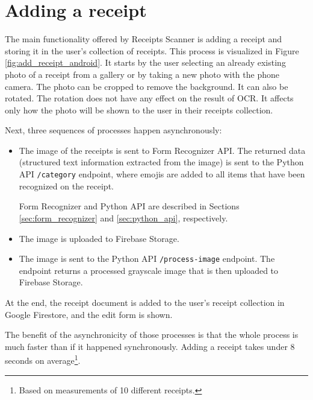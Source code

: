 \documentclass[
  printed, %
  table,   %
  oneside, %
  lof,     %
  lot,     %
]{fithesis3}
\begin{document}
\section{Adding a receipt}
The main functionality offered by Receipts Scanner is adding a receipt and storing it in the user's collection of receipts.
This process is visualized in Figure \ref{fig:add_receipt_android}.
It starts by the user selecting an already existing photo of a receipt from a gallery or by taking a new photo with the phone camera. The photo can be cropped to remove the background. It can also be rotated. The rotation does not have any effect on the result of OCR. It affects only how the photo will be shown to the user in their receipts collection.

Next, three sequences of processes happen asynchronously:

\begin{itemize}
    \item The image of the receipts is sent to Form Recognizer API. The returned data (structured text information extracted from the image) is sent to the Python API \texttt{/category} endpoint, where emojis are added to all items that have been recognized on the receipt.
    
    Form Recognizer and Python API are described in Sections \ref{sec:form_recognizer} and \ref{sec:python_api}, respectively.
    
    \item The image is uploaded to Firebase Storage.

    \item The image is sent to the Python API \texttt{/process-image} endpoint. The endpoint returns a processed grayscale image that is then uploaded to Firebase Storage.
\end{itemize}

At the end, the receipt document is added to the user's receipt collection in Google Firestore, and the edit form is shown. 

The benefit of the asynchronicity of those processes is that the whole process is much faster than if it happened synchronously. Adding a receipt takes under 8 seconds on average\footnote{Based on measurements of 10 different receipts.}.
\end{document}
